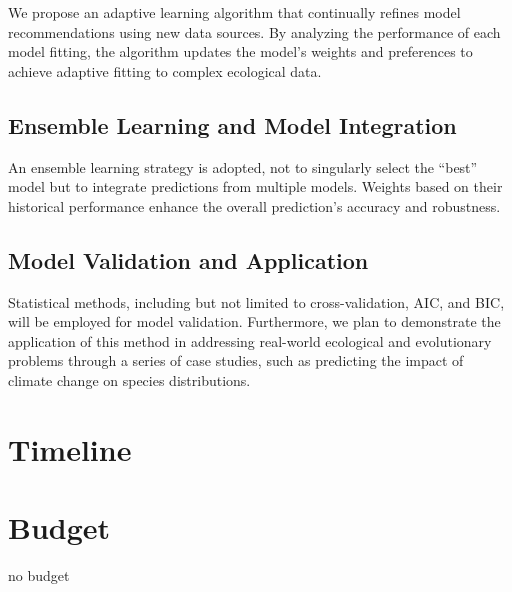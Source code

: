 \documentclass{article}
\begin{document}
We propose an adaptive learning algorithm that continually refines model recommendations using new data sources. By analyzing the performance of each model fitting, the algorithm updates the model's weights and preferences to achieve adaptive fitting to complex ecological data.

\subsection{Ensemble Learning and Model Integration}

An ensemble learning strategy is adopted, not to singularly select the “best” model but to integrate predictions from multiple models. Weights based on their historical performance enhance the overall prediction's accuracy and robustness.

\subsection{Model Validation and Application}

Statistical methods, including but not limited to cross-validation, AIC, and BIC, will be employed for model validation. Furthermore, we plan to demonstrate the application of this method in addressing real-world ecological and evolutionary problems through a series of case studies, such as predicting the impact of climate change on species distributions.
\section{Timeline}

\section{Budget}
no budget
\newpage  

 

\end{document}
